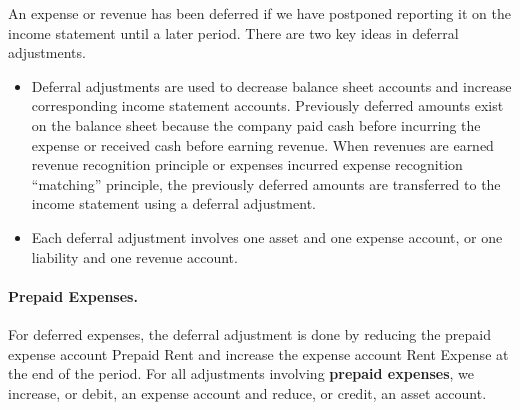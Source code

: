 \documentclass[../main.tex]{subfiles}
\begin{document}
	An expense or revenue has been deferred if we have postponed reporting it 
	on the income statement until a later period. There are two key ideas in 
	deferral adjustments.
	
 	\begin{itemize}[noitemsep]
		\item Deferral adjustments are used to decrease balance sheet accounts 
		and increase corresponding income statement accounts. Previously 
		deferred amounts exist on the balance sheet because the company paid 
		cash before incurring the expense or received cash before earning 
		revenue. When revenues are earned \ie revenue 
		recognition principle or expenses incurred \ie expense 
		recognition “matching” principle, the previously deferred amounts are 
		transferred to the income statement using a deferral adjustment.
		\item Each deferral adjustment involves one asset and one expense 
		account, or one liability and one revenue account. 
	\end{itemize}
	
	\paragraph{Prepaid Expenses.}For deferred expenses, the 
	deferral adjustment is done by reducing the prepaid expense account \eg 
	Prepaid Rent and increase the expense account \eg Rent Expense at the end 
	of the period. For all adjustments involving \textbf{prepaid expenses}, we 
	increase, or debit, an expense account and reduce, or credit, an asset 
	account.
	
\end{document}
